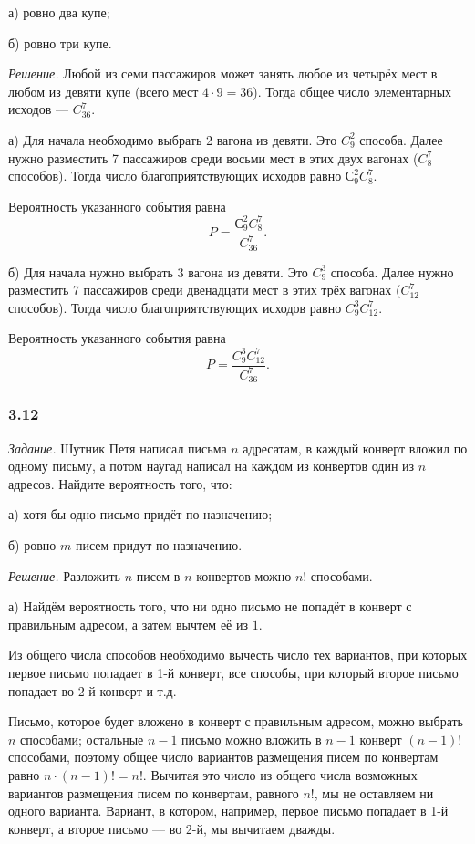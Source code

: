 \documentclass{book}
\begin{document}
а) ровно два купе;

б) ровно три купе.

\textit{Решение.}
Любой из семи пассажиров может занять любое из четырёх мест в любом из девяти купе (всего мест $4 \cdot 9 = 36$).
Тогда общее число элементарных исходов --- $C_{36}^7$.

а) Для начала необходимо выбрать 2 вагона из девяти.
Это $C_9^2$ способа.
Далее нужно разместить 7 пассажиров среди восьми мест в этих двух вагонах ($C_{8}^7$ способов).
Тогда число благоприятствующих исходов равно $С_9^2 C_8^7$.

Вероятность указанного события равна
$$P =
\frac{С_9^2 C_8^7}{C_{36}^7}.$$

б) Для начала нужно выбрать 3 вагона из девяти.
Это $C_9^3$ способа.
Далее нужно разместить 7 пассажиров среди двенадцати мест в этих трёх вагонах ($C_{12}^7$ способов).
Тогда число благоприятствующих исходов равно $C_9^3 C_{12}^7$.

Вероятность указанного события равна
$$P =
\frac{C_9^3 C_{12}^7}{C_{36}^7}.$$

\subsubsection*{3.12}

\textit{Задание.} Шутник Петя написал письма $n$ адресатам, в каждый конверт вложил по одному письму, а потом наугад написал на каждом из конвертов один из $n$ адресов.
Найдите вероятность того, что:

а) хотя бы одно письмо придёт по назначению;

б) ровно $m$ писем придут по назначению. 

\textit{Решение.} Разложить $n$ писем в $n$ конвертов можно $n!$ способами.

а) Найдём вероятность того, что ни одно письмо не попадёт в конверт с правильным адресом, а затем вычтем её из $1$.

Из общего числа способов необходимо вычесть число тех вариантов, при которых первое письмо попадает в 1-й конверт,
все способы, при который второе письмо попадает во 2-й конверт и т.д.

Письмо, которое будет вложено в конверт с правильным адресом, можно выбрать $n$ способами;
остальные $n - 1$ письмо можно вложить в $n - 1$ конверт $ \left( n - 1 \right)!$ способами,
поэтому общее число вариантов размещения писем по конвертам равно $n \cdot \left( n - 1 \right)! = n!$.
Вычитая это число из общего числа возможных вариантов размещения писем по конвертам, равного $n!$,
мы не оставляем ни одного варианта.
Вариант, в котором, например, первое письмо попадает в 1-й конверт, а второе письмо --- во 2-й, мы вычитаем дважды.
\end{document}
